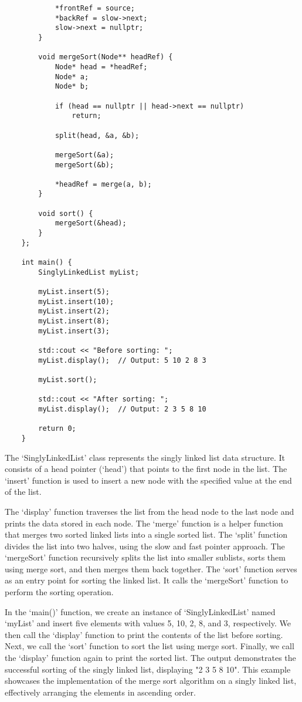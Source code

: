 \begin{solution}
\begin{verbatim}
            *frontRef = source;
            *backRef = slow->next;
            slow->next = nullptr;
        }
    
        void mergeSort(Node** headRef) {
            Node* head = *headRef;
            Node* a;
            Node* b;
    
            if (head == nullptr || head->next == nullptr)
                return;
    
            split(head, &a, &b);
    
            mergeSort(&a);
            mergeSort(&b);
    
            *headRef = merge(a, b);
        }
    
        void sort() {
            mergeSort(&head);
        }
    };
    
    int main() {
        SinglyLinkedList myList;
    
        myList.insert(5);
        myList.insert(10);
        myList.insert(2);
        myList.insert(8);
        myList.insert(3);
    
        std::cout << "Before sorting: ";
        myList.display();  // Output: 5 10 2 8 3
    
        myList.sort();
    
        std::cout << "After sorting: ";
        myList.display();  // Output: 2 3 5 8 10
    
        return 0;
    }        
    \end{verbatim}

    \horizontalline

    The `SinglyLinkedList' class represents the singly linked list data structure. It consists of a head pointer (`head') that points to the first node in the list. The `insert' function is used to insert a new node with the specified value at the end of the list.

    The `display' function traverses the list from the head node to the last node and prints the data stored in each node. The `merge' function is a helper function that merges two sorted linked lists into a single sorted list. The `split' function divides the list into two halves, using the slow and fast pointer approach. The `mergeSort' 
    function recursively splits the list into smaller sublists, sorts them using merge sort, and then merges them back together. The `sort' function serves as an entry point for sorting the linked list. It calls the `mergeSort' function to perform the sorting operation.

    In the `main()' function, we create an instance of `SinglyLinkedList' named `myList' and insert five elements with values 5, 10, 2, 8, and 3, respectively. We then call the `display' function to print the contents of the list before sorting. Next, we call the `sort' function to sort the list using merge sort. Finally, we call the `display' 
    function again to print the sorted list. The output demonstrates the successful sorting of the singly linked list, displaying "2 3 5 8 10". This example showcases the implementation of the merge sort algorithm on a singly linked list, effectively arranging the elements in ascending order.
\end{solution}

